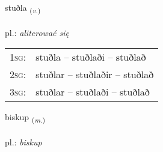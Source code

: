 \documentclass[frontgrid, backgrid]{flacards}\usepackage[]{graphicx}\usepackage[]{xcolor}
\begin{document}
\renewcommand{\flhead}{\vskip5pt \fboxsep=0pt {\small\bfseries\footnotesize Sagnorð | czasownik}}
\renewcommand{\fcfoot}{\vskip5pt \fboxsep=0pt \hspace{2pt}{\small\bfseries\footnotesize 1K}}

\renewcommand{\blhead}{\vskip5pt {\small\bfseries\footnotesize Sagnorð | czasownik }}
\renewcommand{\bcfoot}{\vskip5pt \hspace{2pt}{\small\bfseries\footnotesize 1K}}


{stuðla \small{\textsubscript{(\textit{v.})}} \\[1ex] %
\textphonetic{[stʏðla]} \\
pl.: \emph{aliterować się} \\  [2ex]
\renewcommand*{\arraystretch}{0.8}
\begin{tabular}{p{1cm}l}
\textsc{1sg}: & stuðla -- stuðlaði -- stuðlað \\ 
\textsc{2sg}: & stuðlar -- stuðlaðir -- stuðlað \\ 
\textsc{3sg}: & stuðlar -- stuðlaði -- stuðlað \\ 
\end{tabular}
}

\renewcommand{\flhead}{\vskip5pt \fboxsep=0pt {\small\bfseries\footnotesize Nafnorð | rzeczownik}}
\renewcommand{\fcfoot}{\vskip5pt \fboxsep=0pt \hspace{2pt}{\small\bfseries\footnotesize 1K}}

\renewcommand{\blhead}{\vskip5pt {\small\bfseries\footnotesize Nafnorð | rzeczownik }}
\renewcommand{\bcfoot}{\vskip5pt \hspace{2pt}{\small\bfseries\footnotesize 1K}}


{biskup \small{\textsubscript{(\textit{m.})}} \\[1ex] %
\textphonetic{[pɪskʏp]} \\
pl.: \emph{biskup} \\  [2ex]
\renewcommand*{\arraystretch}{0.8}
}
\end{document}
